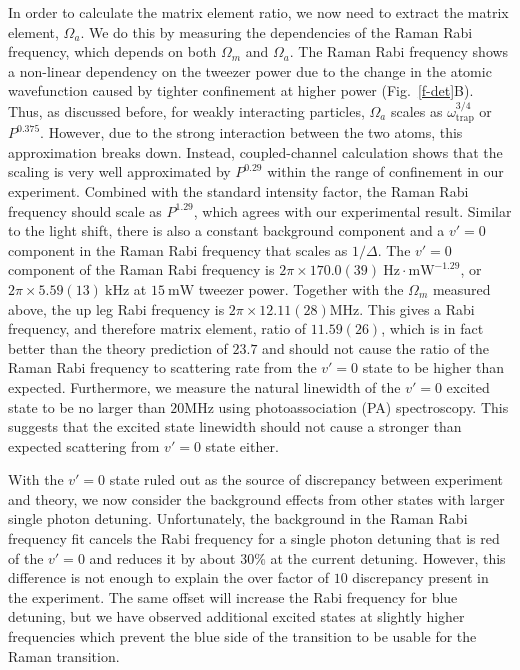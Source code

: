 \documentclass[aps,prl,twocolumn,superscriptaddress]{revtex4-1}
\begin{document}
In order to calculate the matrix element ratio,
we now need to extract the matrix element, $ \Omega_a $.
We do this by measuring the dependencies of the Raman Rabi frequency,
which depends on both $\Omega_m$ and $\Omega_a$.
The Raman Rabi frequency shows a non-linear dependency on the tweezer power
due to the change in the atomic wavefunction caused by
tighter confinement at higher power (Fig.~\ref{f-det}B).
Thus, as discussed before, for weakly interacting particles,
$\Omega_a$ scales as $ \omega_{\text{trap}}^{3/4}$ or $P^{0.375}$.
However, due to the strong interaction between the two atoms, this approximation breaks down.
Instead, coupled-channel calculation shows that the scaling
is very well approximated by $P^{0.29}$ within the range of confinement in our experiment.
Combined with the standard intensity factor, the Raman Rabi frequency should scale as $P^{1.29}$,
which agrees with our experimental result.
Similar to the light shift, there is also a constant background component
and a $v'=0$ component in the Raman Rabi frequency that scales as $1/\Delta$.
The $v'=0$ component of the Raman Rabi frequency is
$2\pi\times170.0(39) ~\mathrm{Hz\cdot mW^{-1.29}}$,
or $2\pi \times 5.59(13)~\mathrm{kHz}$ at $15 ~\mathrm{mW}$ tweezer power.
Together with the $\Omega_m$ measured above, the up leg Rabi frequency is
$2\pi \times 12.11(28)\mathrm{MHz}$.
This gives a Rabi frequency, and therefore matrix element, ratio of $11.59(26)$,
which is in fact better than the theory prediction of $23.7$
and should not cause the ratio of the Raman Rabi frequency to scattering rate
from the $v'=0$ state to be higher than expected.
Furthermore, we measure the natural linewidth of the $v'=0$ excited state to be no larger than $20 \mathrm{MHz}$ using photoassociation (PA) spectroscopy.
This suggests that the excited state linewidth should not cause
a stronger than expected scattering from $v'=0$ state either.

With the $ v' = 0 $ state ruled out as the source of discrepancy between experiment and theory,
we now consider the background effects from other states with larger single photon detuning.
Unfortunately, the background in the Raman Rabi frequency fit cancels the Rabi frequency
for a single photon detuning that is red of the $ v' = 0 $
and reduces it by about $30\%$ at the current detuning.
However, this difference is not enough to explain the over factor of $10$ discrepancy
present in the experiment.
The same offset will increase the Rabi frequency for blue detuning,
but we have observed additional excited states at slightly higher frequencies
which prevent the blue side of the transition to be usable for the Raman transition.
\end{document}
